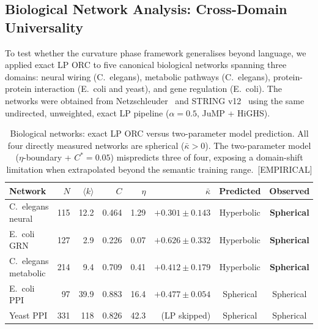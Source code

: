 \documentclass[11pt,a4paper]{article}
\newcommand{\kbar}{\bar{\kappa}}
\begin{document}
\subsection{Biological Network Analysis: Cross-Domain Universality}
\label{sec:bio}

To test whether the curvature phase framework generalises beyond language, we applied exact LP ORC to five canonical biological networks spanning three domains: neural wiring (C.\ elegans), metabolic pathways (C.\ elegans), protein-protein interaction (E.\ coli and yeast), and gene regulation (E.\ coli). The networks were obtained from Netzschleuder~\cite{peixoto2020netzschleuder} and STRING v12~\cite{szklarczyk2023string} using the same undirected, unweighted, exact LP pipeline ($\alpha = 0.5$, JuMP + HiGHS).

\begin{table}[h]
\centering
\small
\caption{Biological networks: exact LP ORC versus two-parameter model prediction. All four directly measured networks are spherical ($\kbar > 0$). The two-parameter model ($\eta$-boundary + $C^* = 0.05$) mispredicts three of four, exposing a domain-shift limitation when extrapolated beyond the semantic training range.~[EMPIRICAL]}
\label{tab:bio}
\begin{tabular}{@{}lrrrrrcc@{}}
\toprule
Network & $N$ & $\langle k \rangle$ & $C$ & $\eta$ & $\kbar$ & Predicted & Observed \\
\midrule
C.\ elegans neural   & 115 & 12.2 & 0.464 & 1.29 & $+0.301 \pm 0.143$ & Hyperbolic & \textbf{Spherical} \\
E.\ coli GRN         & 127 &  2.9 & 0.226 & 0.07 & $+0.626 \pm 0.332$ & Hyperbolic & \textbf{Spherical} \\
C.\ elegans metabolic & 214 &  9.4 & 0.709 & 0.41 & $+0.412 \pm 0.179$ & Hyperbolic & \textbf{Spherical} \\
E.\ coli PPI         &  97 & 39.9 & 0.883 & 16.4 & $+0.477 \pm 0.054$ & Spherical  & Spherical \\
Yeast PPI            & 331 & 118  & 0.826 & 42.3 & (LP skipped)       & Spherical  & Spherical \\
\bottomrule
\end{tabular}
\end{table}
\end{document}
